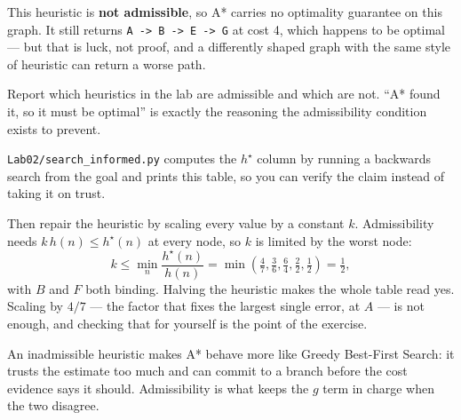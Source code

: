 \begin{pitfall}
This heuristic is \textbf{not admissible}, so A* carries no optimality guarantee on this graph. It still returns \texttt{A -> B -> E -> G} at cost 4, which happens to be optimal --- but that is luck, not proof, and a differently shaped graph with the same style of heuristic can return a worse path.

Report which heuristics in the lab are admissible and which are not. ``A* found it, so it must be optimal'' is exactly the reasoning the admissibility condition exists to prevent.
\end{pitfall}

\begin{tryit}
\texttt{Lab02/search\_informed.py} computes the \(h^\star\) column by running a backwards search from the goal and prints this table, so you can verify the claim instead of taking it on trust.

Then repair the heuristic by scaling every value by a constant \(k\). Admissibility needs \(k\,h(n)\leq h^\star(n)\) at every node, so \(k\) is limited by the worst node:
\[
k\leq\min_n \frac{h^\star(n)}{h(n)}
=\min\left(\tfrac{4}{7},\tfrac{3}{6},\tfrac{6}{4},\tfrac{2}{2},\tfrac{1}{2}\right)=\tfrac12,
\]
with \(B\) and \(F\) both binding. Halving the heuristic makes the whole table read yes. Scaling by \(4/7\) --- the factor that fixes the largest single error, at \(A\) --- is not enough, and checking that for yourself is the point of the exercise.
\end{tryit}

\begin{intuition}
An inadmissible heuristic makes A* behave more like Greedy Best-First Search: it trusts the estimate too much and can commit to a branch before the cost evidence says it should. Admissibility is what keeps the \(g\) term in charge when the two disagree.
\end{intuition}

\begin{mlfigure}
\end{mlfigure}

